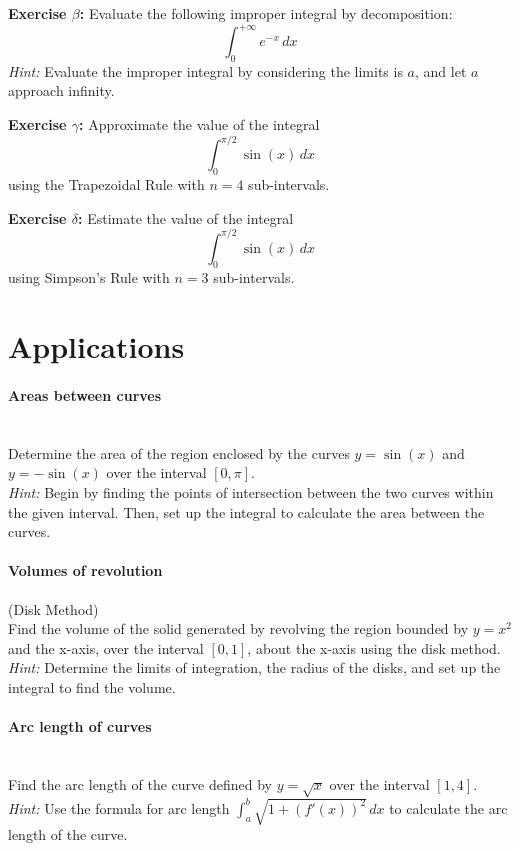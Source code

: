 \documentclass[]{article}
\begin{document}
	\textbf{Exercise $\beta$:}
	Evaluate the following improper integral by decomposition:
	\[
	\int_0^{+\infty} e^{-x}\, dx
	\]
	\textit{Hint:} Evaluate the improper integral by considering the limits is $a$, and let $a$ approach infinity.
	
	\textbf{Exercise $\gamma$:}
	Approximate the value of the integral
	\[
	\int_0^{\pi/2} \sin(x) \, dx
	\]
	using the Trapezoidal Rule with \(n = 4\) sub-intervals.
	
	\textbf{Exercise $\delta$:}
	Estimate the value of the integral
	\[
	\int_0^{\pi/2} \sin(x) \, dx
	\]
	using Simpson's Rule with \(n = 3\) sub-intervals.
	
	
	\section{Applications}
	\paragraph{Areas between curves}\mbox{}\\
	Determine the area of the region enclosed by the curves \(y = \sin(x)\) and \(y = -\sin(x)\) over the interval \([0, \pi]\).\\
	\textit{Hint:} Begin by finding the points of intersection between the two curves within the given interval.
	Then, set up the integral to calculate the area between the curves.
	
	\paragraph{Volumes of revolution} (Disk Method)\\
	Find the volume of the solid generated by revolving the region bounded by \(y = x^2\) and the x-axis, over the interval \([0, 1]\), about the x-axis using the disk method.\\
	\textit{Hint:} Determine the limits of integration, the radius of the disks, and set up the integral to find the volume.
	
	\paragraph{Arc length of curves}\mbox{}\\
	Find the arc length of the curve defined by \(y = \sqrt{x}\) over the interval \([1, 4]\).\\
	\textit{Hint:} Use the formula for arc length \(\int_a^b \sqrt{1 + (f'(x))^2} \, dx\) to calculate the arc length of the curve.
	
\end{document}
